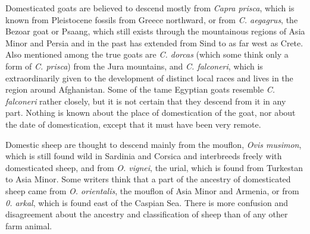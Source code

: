 Domesticated goats are believed to descend mostly from \textit{Capra prisca}, which is known from Pleistocene
fossils from Greece northward, or from \textit{C. aegagrus}, the Bezoar goat or Psaang, which still exists
through the mountainous regions of Asia Minor and Persia and in the past has extended from Sind to as far west
as Crete. Also mentioned among the true goats are \textit{C. dorcas} (which some think only a form of
\textit{C. prisca}) from the Jura mountains, and \textit{C. falconeri}, which is extraordinarily given to
the development of distinct local races and lives in the region around Afghanistan. Some of the tame Egyptian
goats resemble \textit{C. falconeri} rather closely, but it is not certain that they descend from it in any
part. Nothing is known about the place of domestication of the goat, nor about the date of domestication,
except that it must have been very remote.

Domestic sheep are thought to descend mainly from the mouflon, \textit{Ovis musimon}, which is still found
wild in Sardinia and Corsica and interbreeds freely with domesticated sheep, and from \textit{O. vignei},
the urial, which is found from Turkestan to Asia Minor. Some writers think that a part of the ancestry of domesticated 
sheep came from \textit{O. orientalis}, the mouflon of Asia Minor and Armenia, or from \textit{0. arkal}, which is
found east of the Caspian Sea. There is more confusion and disagreement about the ancestry and classification of sheep 
than of any other farm animal.

